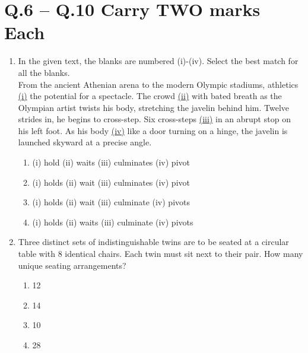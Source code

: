 \documentclass{article}
\begin{document}
\section*{Q.6 – Q.10 Carry TWO marks Each}
\begin{enumerate}[leftmargin=*, start=6, label=Q.\arabic*.]
    \item In the given text, the blanks are numbered (i)-(iv). Select the best match for all the blanks. \\ 
    From the ancient Athenian arena to the modern Olympic stadiums, athletics \underline{\hspace{0.3cm}(i)\hspace{0.3cm}} the potential for a spectacle. The crowd \underline{\hspace{0.3cm}(ii)\hspace{0.3cm}} with bated breath as the Olympian artist twists his body, stretching the javelin behind him. Twelve strides in, he begins to cross-step. Six cross-steps \underline{\hspace{0.3cm}(iii)\hspace{0.3cm}} in an abrupt stop on his left foot. As his body \underline{\hspace{0.3cm}(iv)\hspace{0.3cm}} like a door turning on a hinge, the javelin is launched skyward at a precise angle.

    \begin{multicols}{2}
    \begin{enumerate}
        \item (i) hold (ii) waits (iii) culminates (iv) pivot 
        \item (i) holds (ii) wait (iii) culminates (iv) pivot 
        \item (i) holds (ii) wait (iii) culminate (iv) pivots 
        \item (i) holds (ii) waits (iii) culminate (iv) pivots
    \end{enumerate}
    \end{multicols}

    \item Three distinct sets of indistinguishable twins are to be seated at a circular table with 8 identical chairs. Each twin must sit next to their pair. How many unique seating arrangements?
    
    \begin{multicols}{4}
        \begin{enumerate}
            \item 12
            \item 14
            \item 10
            \item 28
        \end{enumerate}
    \end{multicols}


\end{enumerate}
\end{document}
